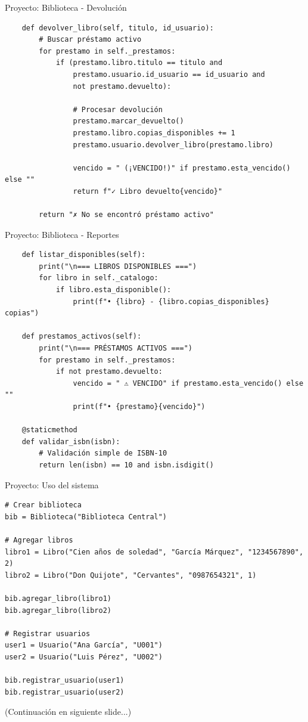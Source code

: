 \documentclass{beamer}
\begin{document}
\begin{frame}[fragile]{Proyecto: Biblioteca - Devolución \faUndoAlt}
\begin{lstlisting}
    def devolver_libro(self, titulo, id_usuario):
        # Buscar préstamo activo
        for prestamo in self._prestamos:
            if (prestamo.libro.titulo == titulo and 
                prestamo.usuario.id_usuario == id_usuario and 
                not prestamo.devuelto):
                
                # Procesar devolución
                prestamo.marcar_devuelto()
                prestamo.libro.copias_disponibles += 1
                prestamo.usuario.devolver_libro(prestamo.libro)
                
                vencido = " (¡VENCIDO!)" if prestamo.esta_vencido() else ""
                return f"✓ Libro devuelto{vencido}"
        
        return "✗ No se encontró préstamo activo"
\end{lstlisting}
\end{frame}

\begin{frame}[fragile]{Proyecto: Biblioteca - Reportes \faChartBar}
\begin{lstlisting}
    def listar_disponibles(self):
        print("\n=== LIBROS DISPONIBLES ===")
        for libro in self._catalogo:
            if libro.esta_disponible():
                print(f"• {libro} - {libro.copias_disponibles} copias")
    
    def prestamos_activos(self):
        print("\n=== PRÉSTAMOS ACTIVOS ===")
        for prestamo in self._prestamos:
            if not prestamo.devuelto:
                vencido = " ⚠ VENCIDO" if prestamo.esta_vencido() else ""
                print(f"• {prestamo}{vencido}")
    
    @staticmethod
    def validar_isbn(isbn):
        # Validación simple de ISBN-10
        return len(isbn) == 10 and isbn.isdigit()
\end{lstlisting}
\end{frame}

\begin{frame}[fragile]{Proyecto: Uso del sistema \faTerminal}
\begin{lstlisting}
# Crear biblioteca
bib = Biblioteca("Biblioteca Central")

# Agregar libros
libro1 = Libro("Cien años de soledad", "García Márquez", "1234567890", 2)
libro2 = Libro("Don Quijote", "Cervantes", "0987654321", 1)

bib.agregar_libro(libro1)
bib.agregar_libro(libro2)

# Registrar usuarios
user1 = Usuario("Ana García", "U001")
user2 = Usuario("Luis Pérez", "U002")

bib.registrar_usuario(user1)
bib.registrar_usuario(user2)
\end{lstlisting}

\small(Continuación en siguiente slide...)
\end{frame}
\end{document}
